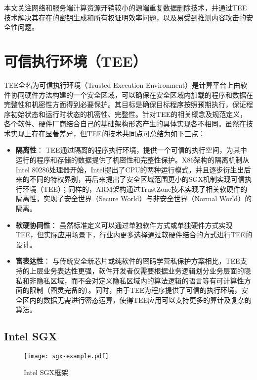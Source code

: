 本文关注网络和服务端计算资源开销较小的源端重复数据删除技术，并通过TEE技术解决其存在的密钥生成和所有权证明效率问题，以及易受到推测内容攻击的安全性问题。

\section{可信执行环境（TEE）}
\label{sec:background-tee}

TEE全名为可信执行环境（Trusted Execution Environment）是计算平台上由软件协同硬件方法构建的一个安全区域，可以确保在安全区域内加载的程序和数据在完整性和机密性方面得到必要保护。其目标是确保目标程序按照预期执行，保证程序初始状态和运行时状态的机密性、完整性。针对TEE的相关概念及规范定义，各个软件、硬件厂商结合自己的基础架构形态产生的具体实现各不相同。虽然在技术实现上存在显著差异，但TEE的技术共同点可总结为如下三点：

\begin{itemize}[leftmargin=*]
    \item \textbf{隔离性}：
    TEE通过隔离的程序执行环境，提供一个可信的执行空间，为其中运行的程序和存储的数据提供了机密性和完整性保护。X86架构的隔离机制从Intel 80286处理器开始，Intel提出了CPU的两种运行模式，并且逐步衍生出后来的不同的特权界别，再后来提出了安全区域范围更小的SGX机制实现可信执行环境（TEE）；同样的，ARM架构通过TrustZone技术实现了相关软硬件的隔离性，实现了安全世界（Secure World）与非安全世界（Normal World）的隔离。
    \item \textbf{软硬协同性}：
    虽然标准定义可以通过单独软件方式或单独硬件方式实现TEE，但实际应用场景下，行业内更多选择通过软硬件结合的方式进行TEE的设计。
    \item \textbf{富表达性}：
    与传统安全新芯片或纯软件的密码学营私保护方案相比，TEE支持的上层业务表达性更强，软件开发者仅需要根据业务逻辑划分业务层面的隐私和非隐私区域，而不会对定义隐私区域内的算法逻辑的语言等有可计算性方面的限制（图灵完备的）。同时，由于TEE为程序提供了可信的执行环境，安全区内的数据无需进行密态运算，使得TEE应用可以支持更多的算计及复杂的算法。
\end{itemize}

\subsection{Intel SGX}
\label{subsec:background-tee-sgx}

\begin{figure}[!htb]
    \small
    \centering
    \texttt{[image: sgx-example.pdf]}
    \caption{Intel SGX框架} 
    \label{fig:sgx-arch}
\end{figure}

